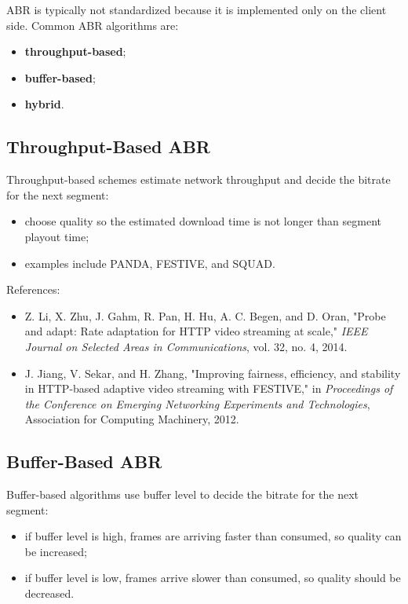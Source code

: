 ABR is typically not standardized because it is implemented only on the client side. Common ABR algorithms are:

\begin{itemize}
\item \textbf{throughput-based};
\item \textbf{buffer-based};
\item \textbf{hybrid}.
\end{itemize}

\subsection{Throughput-Based ABR}

Throughput-based schemes estimate network throughput and decide the bitrate for the next segment:

\begin{itemize}
\item choose quality so the estimated download time is not longer than segment playout time;
\item examples include PANDA, FESTIVE, and SQUAD.
\end{itemize}

References:

\begin{itemize}
\item Z. Li, X. Zhu, J. Gahm, R. Pan, H. Hu, A. C. Begen, and D. Oran, "Probe and adapt: Rate adaptation for HTTP video streaming at scale," \textit{IEEE Journal on Selected Areas in Communications}, vol. 32, no. 4, 2014.
\item J. Jiang, V. Sekar, and H. Zhang, "Improving fairness, efficiency, and stability in HTTP-based adaptive video streaming with FESTIVE," in \textit{Proceedings of the Conference on Emerging Networking Experiments and Technologies}, Association for Computing Machinery, 2012.
\end{itemize}

\subsection{Buffer-Based ABR}

Buffer-based algorithms use buffer level to decide the bitrate for the next segment:

\begin{itemize}
\item if buffer level is high, frames are arriving faster than consumed, so quality can be increased;
\item if buffer level is low, frames arrive slower than consumed, so quality should be decreased.
\end{itemize}

